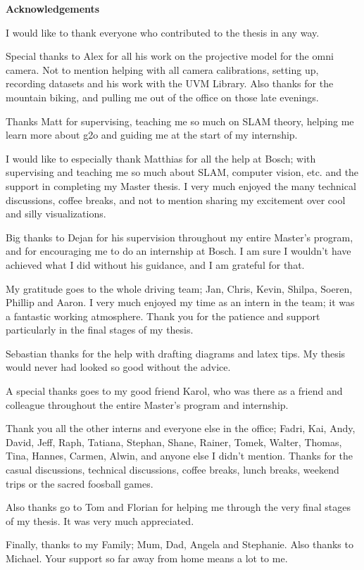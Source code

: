 \clearemptydoublepage
{}
{}	

\vspace*{1cm}
\begin{center}
{\Large \bf Acknowledgements}
\end{center}

I would like to thank everyone who contributed to the thesis in any way.

Special thanks to Alex for all his work on the projective model for the omni camera.  Not to mention helping with all camera calibrations, setting up, recording datasets and his work with the UVM Library.  Also thanks for the mountain biking, and pulling me out of the office on those late evenings.

Thanks Matt for supervising, teaching me so much on SLAM theory, helping me learn more about g2o and guiding me at the start of my internship.  

I would like to especially thank Matthias for all the help at Bosch; with supervising and teaching me so much about SLAM, computer vision, etc. and the support in completing my Master thesis.  I very much enjoyed the many technical discussions, coffee breaks, and not to mention sharing my excitement over cool and silly visualizations.

Big thanks to Dejan for his supervision throughout my entire Master's program, and for encouraging me to do an internship at Bosch.  I am sure I wouldn't have achieved what I did without his guidance, and I am grateful for that. 

My gratitude goes to the whole driving team; Jan, Chris, Kevin, Shilpa, Soeren, Phillip and Aaron.  I very much enjoyed my time as an intern in the team; it was a fantastic working atmosphere.  Thank you for the patience and support particularly in the final stages of my thesis.


Sebastian thanks for the help with drafting diagrams and latex tips. My thesis would never had looked so good without the advice.

A special thanks goes to my good friend Karol, who was there as a friend and colleague throughout the entire Master's program and internship.  

Thank you all the other interns and everyone else in the office; Fadri, Kai, Andy, David, Jeff, Raph, Tatiana, Stephan, Shane, Rainer, Tomek, Walter, Thomas, Tina, Hannes, Carmen, Alwin, and anyone else I didn't mention.  Thanks for the casual discussions, technical discussions, coffee breaks, lunch breaks, weekend trips or the sacred foosball games.

Also thanks go to Tom and Florian for helping me through the very final stages of my thesis.  It was very much appreciated.

Finally, thanks to my Family; Mum, Dad, Angela and Stephanie.  Also thanks to Michael.  Your support so far away from home means a lot to me.

\vspace{1cm}
